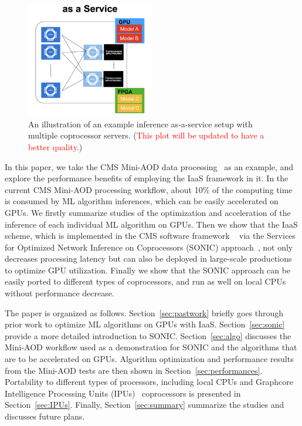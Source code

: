 \begin{figure}[htp]
    \centering
    \includegraphics[width=0.50\textwidth]{plots/illustration.png}
    \caption{An illustration of an example inference as-a-service setup with multiple coprocessor servers. (\textcolor{red}{This plot will be updated to have a better quality.})}
    \label{fig:illustration}
\end{figure}


In this paper, we take the CMS Mini-AOD data processing~\cite{Petrucciani:2015gjw} as an example, and explore the performance benefits of employing the IaaS framework in it. In the current CMS Mini-AOD processing workflow, about 10\% of the computing time is consumed by ML algorithm inferences, which can be easily accelerated on GPUs. We firstly summarize studies of the optimization and acceleration of the inference of each individual ML algorithm on GPUs. Then we show that the IaaS scheme, which is implemented in the CMS software framework \CMSSW~\cite{CMS:2006myw} via the Services for Optimized Network Inference on Coprocessors (SONIC) approach~\cite{Krupa:2020bwg}, not only decreases processing latency but can also be deployed in large-scale productions to optimize GPU utilization. Finally we show that the SONIC approach can be easily ported to different types of coprocessors, and run as well on local CPUs without performance decrease.

The paper is organized as follows. Section~\ref{sec:pastwork} briefly goes through prior work to optimize ML algorithms on GPUs with IaaS. Section~\ref{sec:sonic} provide a more detailed introduction to SONIC. Section~\ref{sec:algo} discusses the Mini-AOD workflow used as a demonstration for SONIC and the algorithms that are to be accelerated on GPUs.
Algorithm optimization and performance results from the Mini-AOD tests are then shown in Section~\ref{sec:performances}. Portability to different types of processors, including local CPUs and Graphcore Intelligence Processing Units (IPUs)~\cite{Graphcore, IPU_Perf} coprocessors is presented in Section~\ref{sec:IPUs}. Finally, Section~\ref{sec:summary} summarize the studies and discusses future plans.